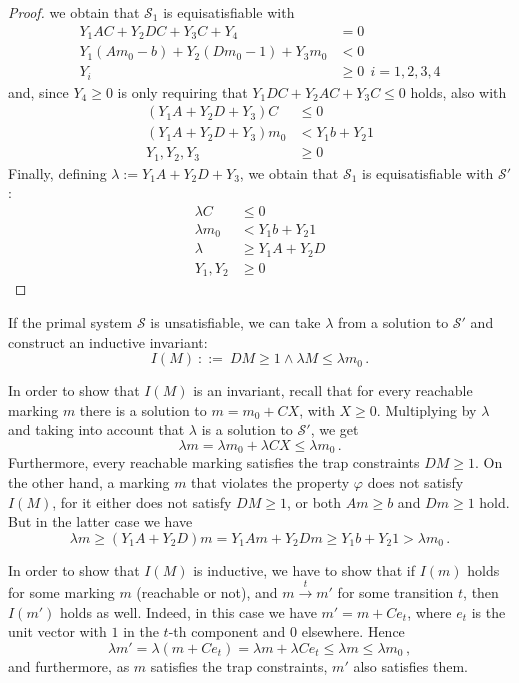 \begin{proof}
we obtain that $\mathcal{S}_1$ is equisatisfiable with 
\begin{align*}
  Y_1 A C         + Y_2 D C         + Y_3 C  + Y_4    & = 0 \\
  Y_1 (A m_0 - b) + Y_2 (D m_0 - 1) + Y_3 m_0         & < 0 \\
  Y_i                               & \ge 0 \ \ i=1,2,3,4
\end{align*}
and, since $Y_4\ge 0$ is only requiring that $Y_1 D C + Y_2 A C + Y_3 C \leq 0$ holds,
also with 
\begin{align*}
  (Y_1 A + Y_2 D + Y_3) C    & \le 0          \\
  (Y_1 A + Y_2 D + Y_3) m_0  & < Y_1 b + Y_2 1 \\
  Y_1,Y_2,Y_3 & \ge 0 
\end{align*}
Finally, defining $\lambda := Y_1 A + Y_2 D + Y_3$, we obtain that
$\mathcal{S}_1$ is equisatisfiable with $\mathcal{S}'$:
\begin{align*}
  \lambda C    & \le 0             \\
  \lambda m_0  & <   Y_1 b + Y_2 1  \\
  \lambda      & \ge Y_1 A + Y_2 D  \\
  Y_1, Y_2        & \ge 0    
\end{align*}
\end{proof}


If the primal system $\mathcal{S}$ is unsatisfiable, we can take $\lambda$ from
a solution to $\mathcal{S}'$ and construct an inductive invariant:
$$I(M)\  ::= \  DM\geq 1 \land \lambda M \leq \lambda m_0\,.$$

In order to show that $I(M)$ is an invariant, recall that for every reachable
marking $m$ there is a solution to $m = m_0 + CX$, with $X\geq 0$. Multiplying
by $\lambda$ and taking into account that $\lambda$ is a solution to $\mathcal{S}'$, we get 
$$\lambda m = \lambda m_0 + \lambda CX \leq \lambda m_0\,.$$
Furthermore, every reachable marking satisfies the trap constraints $DM\geq 1$.
On the other hand, a marking $m$ that violates the property $\varphi$ does
not satisfy $I(M)$, for it either does not satisfy $DM\geq 1$, or both
$Am\geq b$ and $Dm\geq 1$ hold. But in the latter case we have
$$\lambda m \geq (Y_1 A + Y_2 D)m = Y_1 A m + Y_2 D m \geq
Y_1 b + Y_2 1 > \lambda m_0\,.$$
%

In order to show that $I(M)$ is inductive, we have to show that if
$I(m)$ holds for some marking $m$ (reachable or not), and $m \xrightarrow{t} m'$
for some transition $t$, then $I(m')$ holds as well. Indeed, in this case we
have $m' = m + C e_t$, where $e_t$ is the unit vector with $1$ in the $t$-th
component and $0$ elsewhere.
Hence
$$\lambda m' = \lambda(m + Ce_t) = \lambda m + \lambda Ce_t
\le \lambda m \le \lambda m_0\,,$$
and furthermore, as $m$ satisfies the trap constraints, $m'$ also satisfies
them.


